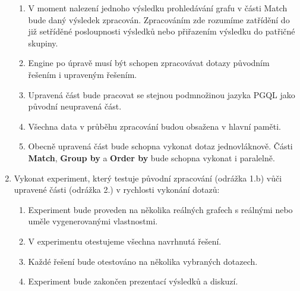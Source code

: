\begin{enumerate}
\begin{enumerate}
\item
V moment nalezení jednoho výsledku prohledávání grafu v části Match bude daný výsledek zpracován.
Zpracováním zde rozumíme zatřídění do již setříděné posloupnosti výsledků nebo přiřazením výsledku do patřičné skupiny.

\item 
Engine po úpravě musí být schopen zpracovávat dotazy původním řešením i upraveným řešením.

\item
Upravená část bude pracovat se stejnou podmnožinou jazyka PGQL jako původní neupravená část.

\item
Všechna data v průběhu zpracování budou obsažena v hlavní paměti.

\item
Obecně upravená část bude schopna vykonat dotaz jednovláknově.
Části \textbf{Match}, \textbf{Group by} a \textbf{Order by} bude schopna vykonat i paralelně.
\end{enumerate}

\item
Vykonat experiment, který testuje původní zpracování (odrážka 1.b) vůči upravené části (odrážka 2.) v rychlosti vykonání dotazů:
\begin{enumerate}
\item Experiment bude proveden na několika reálných grafech s reálnými nebo uměle vygenerovanými vlastnostmi.
\item V experimentu otestujeme všechna navrhnutá řešení.
\item Každé řešení bude otestováno na několika vybraných dotazech.
\item Experiment bude zakončen prezentací výsledků a diskuzí.
\end{enumerate}
\end{enumerate}